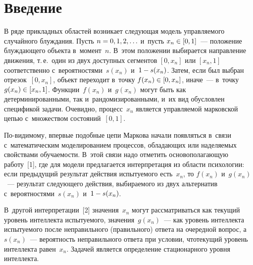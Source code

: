 
  
\vspace*{3pt}



\thispagestyle{headings}

\begin{multicols}{2}

\label{st\stat}

  \section{Введение}
  
  \vspace*{-3pt}
  
  В ряде прикладных областей возникает следующая модель управ\-ля\-емо\-го 
случайного блуж\-да\-ния. Пусть $n\hm=0, 1, 2,\ldots$  и~пусть $x_n\hm\in 
[0,1]$~--- положение блуж\-да\-юще\-го объекта в~момент~$n$. В~этом 
положении выбирается на\-прав\-ле\-ние движения, т.\,е.\ один из двух до\-ступ\-ных 
сег\-мен\-тов $[0, x_n]$ или $[x_n,1]$ соответственно с~вероятностями~$s(x_n)$ 
и~$1\hm- s(x_n)$. Затем, если был выбран отрезок~$[0,x_n]$, объект 
переходит в~точку $f(x_n)\hm\in [0,x_n]$, иначе~--- в~точку $g(x_n)\hm\in 
[x_n,1]$. Функции~$f(x_n)$ и~$g(x_n)$ могут быть как 
детерминированными, так и~рандомизированными, и~их вид обуслов\-лен 
спецификой задачи. Очевидно, процесс~$x_n$ является управ\-ля\-емой 
марковской цепью с~множеством со\-сто\-яний~$[0,1]$.
  
  По-видимому, впервые подобные цепи Маркова начали появляться в~связи с~математическим моделированием процессов, обладающих или наделяемых 
свойствами обуча\-емости. В~этой связи надо отметить основополагающую 
работу~[1], где для модели предлагается интерпретация из об\-ласти 
психологии: если предыдущий результат действия испытуемого есть~$x_n$, 
то $f(x_n)$ и~$g(x_n)$~--- результат сле\-ду\-юще\-го действия, вы\-би\-ра\-емо\-го из 
двух альтернатив с~вероятностями~$s(x_n)$ и~$1\hm-s(x_n)$.
  
  В~другой интерпретации~[2] значения~$x_n$ могут рас\-смат\-ри\-вать\-ся как 
текущий уровень интеллекта\linebreak
 испытуемого, значения~$g(x_n)$~--- как 
уровень интеллекта испытуемого после неправильного (правильного) ответа 
на очередной вопрос, а~$s(x_n)$~--- вероятность неправильного ответа при 
условии, что\linebreak текущий уровень интеллекта равен~$x_n$. Задачей является 
определение стационарного уровня интеллекта.
  

\end{multicols}
